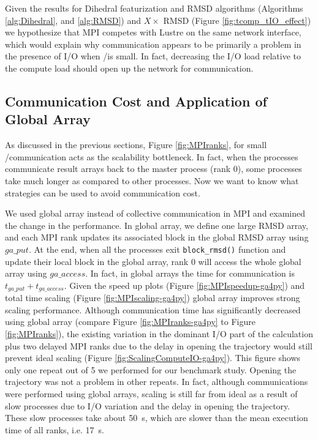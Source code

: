 Given the results for Dihedral featurization and RMSD algorithms (Algorithms \ref{alg:Dihedral}, and \ref{alg:RMSD}) and $X\times$ RMSD (Figure \ref{fig:tcomp_tIO_effect})
we hypothesize that MPI competes with Lustre on the same network interface, which would explain why communication appears to
be primarily a problem in the presence of I/O when \tcomp/\tIO is small.
In fact, decreasing the I/O load relative to the compute load should open up the network for communication. 

\subsection{Communication Cost and Application of Global Array}
\label{Global-Array}
As discussed in the previous sections, Figure \ref{fig:MPIranks}, for small \tcomp/\tIO communication acts as the scalability bottleneck. 
In fact, when the processes communicate result arrays back to the master process (rank 0), some processes take much longer as compared to other processes. 
Now we want to know what strategies can be used to avoid communication cost. 

We used global array instead of collective communication in MPI and examined the change in the performance. 
In global array, we define one large RMSD array, and each MPI rank updates its associated block in the global RMSD array using $ga\_put$. 
At the end, when all the processes exit \texttt{block\_rmsd()} function and update their local block in the global array, rank 0 will access the whole global array using $ga\_access$.
In fact, in global arrays the time for communication is $t_{ga\_put}+t_{ga\_access}$.
Given the speed up plots (Figure \ref{fig:MPIspeedup-ga4py}) and total time scaling (Figure \ref{fig:MPIscaling-ga4py}) global array improves strong scaling performance.
Although communication time has significantly decreased using global array (compare Figure \ref{fig:MPIranks-ga4py} to Figure \ref{fig:MPIranks}),
the existing variation in the dominant I/O part of the calculation plus two delayed MPI ranks due to the delay in opening the trajectory would still prevent ideal scaling (Figure \ref{fig:ScalingComputeIO-ga4py}).
This figure shows only one repeat out of 5 we performed for our benchmark study. 
Opening the trajectory was not a problem in other repeats.
In fact, although communications were performed using global arrays, scaling is still far from ideal as a result of slow processes due to I/O variation and the delay in opening the trajectory.
These slow processes take about 50~s, which are slower than the mean execution time of all ranks, i.e. 17~s. 

